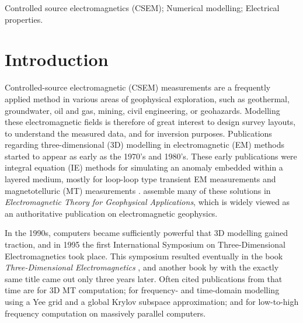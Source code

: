 \documentclass[a4paper, extra, camera,%
]{gji}
\begin{document}
\begin{keywords}
  Controlled source electromagnetics (CSEM); Numerical modelling; Electrical properties.
\end{keywords}


\section{Introduction}

Controlled-source electromagnetic (CSEM) measurements are a frequently applied method in various areas of geophysical exploration, such as geothermal, groundwater, oil and gas, mining, civil engineering, or geohazards. Modelling these electromagnetic fields is therefore of great interest to design survey layouts, to understand the measured data, and for inversion purposes. Publications regarding three-dimensional (3D) modelling in electromagnetic (EM) methods started to appear as early as the 1970's and 1980's. These early publications were integral equation (IE) methods for simulating an anomaly embedded within a layered medium, mostly for loop-loop type transient EM measurements  \citep{GJI.74.Raiche, GEO.75.Hohmann, GJI.82.Das, GEO.86.Newman} and magnetotelluric (MT) measurements \citep{GEO.84.Wannamaker}. \cite{B.SEG.88.Ward} assemble many of these solutions in \emph{Electromagnetic Theory for Geophysical Applications}, which is widely viewed as an authoritative publication on electromagnetic geophysics.

In the 1990s, computers became sufficiently powerful that 3D modelling gained traction, and in 1995 the first International Symposium on Three-Dimensional Electromagnetics took place. This symposium resulted eventually in the book \emph{Three-Dimensional Electromagnetics} \citep{B.SEG.99.Oristaglio}, and another book by \cite{B.02.Wannamaker} with the exactly same title came out only three years later. Often cited publications from that time are \cite{RSC.94.Mackie} for 3D MT computation; \cite{RS.94.Druskin} for frequency- and time-domain modelling using a Yee grid and a global Krylov subspace approximation; and \cite{RS.96.Alumbaugh, GJI.97.Newman} for low-to-high frequency computation on massively parallel computers.
\end{document}
